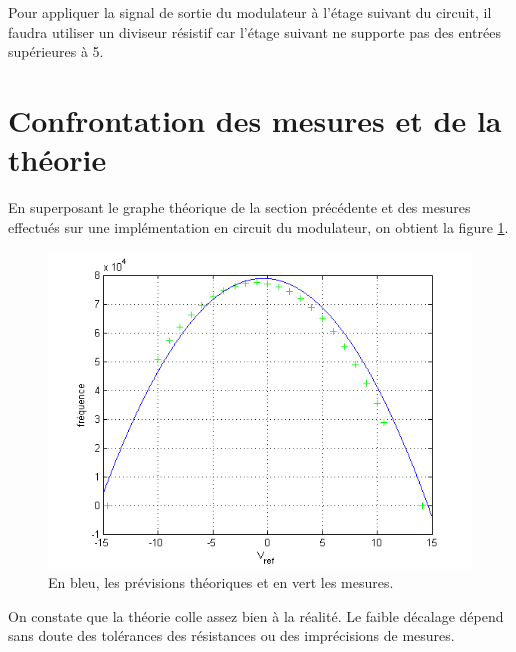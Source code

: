 Pour appliquer la signal de sortie du modulateur
à l'étage suivant du circuit, il faudra utiliser un diviseur
résistif car l'étage suivant ne supporte pas des entrées supérieures
à \unit{5}{\volt}.

\section{Confrontation des mesures et de la théorie}
En superposant le graphe théorique de la section précédente
et des mesures effectués sur une implémentation en circuit
du modulateur, on obtient la figure \ref{fig:sigma-delta-f-vs-vref-dim-vs-real}.

\begin{figure}[ht]
	\centering
	\includegraphics[scale=0.7]{img/sigma-delta-f-vs-vref-dim-vs-real.png}
	\caption{En bleu, les prévisions théoriques et en vert les mesures.}
	\label{fig:sigma-delta-f-vs-vref-dim-vs-real}
\end{figure}

On constate que la théorie colle assez bien à la réalité. Le
faible décalage dépend sans doute des tolérances des résistances
ou des imprécisions de mesures.

